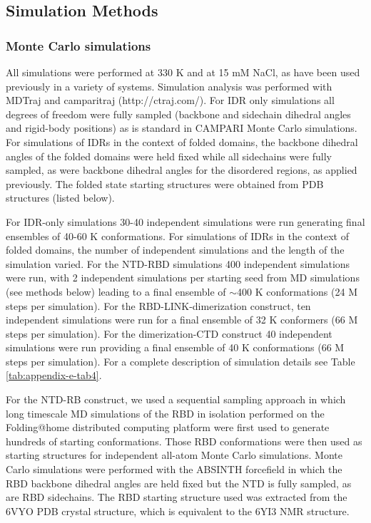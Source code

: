 \documentclass[../main.tex]{subfiles}
\begin{document}
    \subsection{Simulation Methods}
    \subsubsection{Monte Carlo simulations}
        All simulations were performed at 330 K and at 15 mM NaCl, as have been used previously in a variety of systems\cite{Das2016-ri,Holehouse2020-rl,Das2016-ri,Martin2020-yc,Sherry2017-sr}. Simulation analysis was performed with MDTraj and camparitraj (http://ctraj.com/)\cite{McGibbon:2015fv,}. For IDR only simulations all degrees of freedom were fully sampled (backbone and sidechain dihedral angles and rigid-body positions) as is standard in CAMPARI Monte Carlo simulations\cite{Vitalis2009-gh}. For simulations of IDRs in the context of folded domains, the backbone dihedral angles of the folded domains were held fixed while all sidechains were fully sampled, as were backbone dihedral angles for the disordered regions, as applied previously\cite{Ortega2018-oa}. The folded state starting structures were obtained from PDB structures (listed below).

        For IDR-only simulations 30-40 independent simulations were run generating final ensembles of 40-60 K conformations. For simulations of IDRs in the context of folded domains, the number of independent simulations and the length of the simulation varied. For the NTD-RBD simulations 400 independent simulations were run, with 2 independent simulations per starting seed from MD simulations (see methods below) leading to a final ensemble of $\sim$400 K conformations (24 M steps per simulation). For the RBD-LINK-dimerization construct, ten independent simulations were run for a final ensemble of 32 K conformers (66 M steps per simulation). For the dimerization-CTD construct 40 independent simulations were run providing a final ensemble of 40 K conformations (66 M steps per simulation). For a complete description of simulation details see Table \ref{tab:appendix-e-tab4}.

        For the NTD-RB construct, we used a sequential sampling approach in which long timescale MD simulations of the RBD in isolation performed on the Folding@home distributed computing platform were first used to generate hundreds of starting conformations\cite{Shirts:2000du,Zimmerman2020covid-pocket}. Those RBD conformations were then used as starting structures for independent all-atom Monte Carlo simulations. Monte Carlo simulations were performed with the ABSINTH forcefield in which the RBD backbone dihedral angles are held fixed but the NTD is fully sampled, as are RBD sidechains. The RBD starting structure used was extracted from the 6VYO PDB crystal structure, which is equivalent to the 6YI3 NMR structure. 
\end{document}
